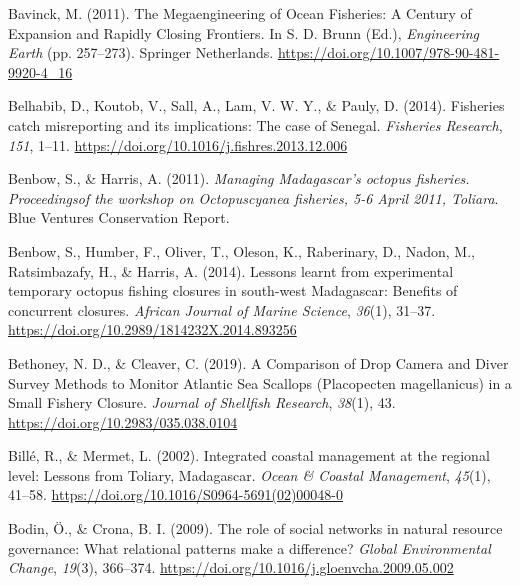 \documentclass[
  12pt,
]{article}
\newlength{\cslhangindent}
\newlength{\cslentryspacingunit} %
\newenvironment{CSLReferences}[2] %
 {%
  \setlength{\parindent}{0pt}
  \ifodd #1
  \let\oldpar\par
  \def\par{\hangindent=\cslhangindent\oldpar}
  \fi
  \setlength{\parskip}{#2\cslentryspacingunit}
 }%
 {}
\begin{document}
\begin{CSLReferences}{1}{2}
\leavevmode{}%
Bavinck, M. (2011). The {Megaengineering} of {Ocean} {Fisheries}: {A} {Century} of {Expansion} and {Rapidly} {Closing} {Frontiers}. In S. D. Brunn (Ed.), \emph{Engineering {Earth}} (pp. 257--273). Springer Netherlands. \url{https://doi.org/10.1007/978-90-481-9920-4_16}

\leavevmode{}%
Belhabib, D., Koutob, V., Sall, A., Lam, V. W. Y., \& Pauly, D. (2014). Fisheries catch misreporting and its implications: {The} case of {Senegal}. \emph{Fisheries Research}, \emph{151}, 1--11. \url{https://doi.org/10.1016/j.fishres.2013.12.006}

\leavevmode{}%
Benbow, S., \& Harris, A. (2011). \emph{Managing {Madagascar}'s octopus fisheries. {Proceedingsof} the workshop on {Octopuscyanea} fisheries, 5-6 {April} 2011, {Toliara}}. Blue Ventures Conservation Report.

\leavevmode{}%
Benbow, S., Humber, F., Oliver, T., Oleson, K., Raberinary, D., Nadon, M., Ratsimbazafy, H., \& Harris, A. (2014). Lessons learnt from experimental temporary octopus fishing closures in south-west {Madagascar}: Benefits of concurrent closures. \emph{African Journal of Marine Science}, \emph{36}(1), 31--37. \url{https://doi.org/10.2989/1814232X.2014.893256}

\leavevmode{}%
Bethoney, N. D., \& Cleaver, C. (2019). A {Comparison} of {Drop} {Camera} and {Diver} {Survey} {Methods} to {Monitor} {Atlantic} {Sea} {Scallops} ({Placopecten} magellanicus) in a {Small} {Fishery} {Closure}. \emph{Journal of Shellfish Research}, \emph{38}(1), 43. \url{https://doi.org/10.2983/035.038.0104}

\leavevmode{}%
Billé, R., \& Mermet, L. (2002). Integrated coastal management at the regional level: Lessons from {Toliary}, {Madagascar}. \emph{Ocean \& Coastal Management}, \emph{45}(1), 41--58. \url{https://doi.org/10.1016/S0964-5691(02)00048-0}

\leavevmode{}%
Bodin, Ö., \& Crona, B. I. (2009). The role of social networks in natural resource governance: {What} relational patterns make a difference? \emph{Global Environmental Change}, \emph{19}(3), 366--374. \url{https://doi.org/10.1016/j.gloenvcha.2009.05.002}


\end{CSLReferences}
\end{document}
